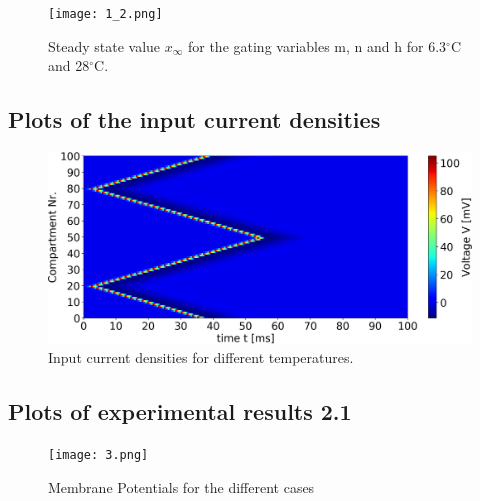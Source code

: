 \documentclass{scrartcl}			%
\begin{document}
\begin{figure}[hbpt!]					%
	 \begin{flushleft}
		\hspace*{-0.1in}
		\texttt{[image: 1\_2.png]}
		\captionsetup{width=\linewidth}  %
		\caption{Steady state value $x_{\infty}$ for the gating variables m, n and h for 6.3$^{\circ}$C and 28$^{\circ}$C.}
		\label{fig1_2} %
	\end{flushleft}
\end{figure}


\newpage
\subsection{Plots of the input current densities}

\begin{figure}[hbpt!]					%
	\begin{flushleft}
		\hspace*{-0.1in}
		\includegraphics[scale=0.356]{2.png}
		\captionsetup{width=\linewidth}  %
		\caption{Input current densities for different temperatures.}
		\label{fig2} %
	\end{flushleft}
\end{figure}

\newpage
\subsection{Plots of experimental results 2.1}

\begin{figure}[hbpt!]					%
	\begin{flushleft}
		\hspace*{-0.1in}
		\texttt{[image: 3.png]}
		\captionsetup{width=\linewidth}  %
		\caption{Membrane Potentials for the different cases}
		\label{fig3} %
	\end{flushleft}
\end{figure}
\end{document}

